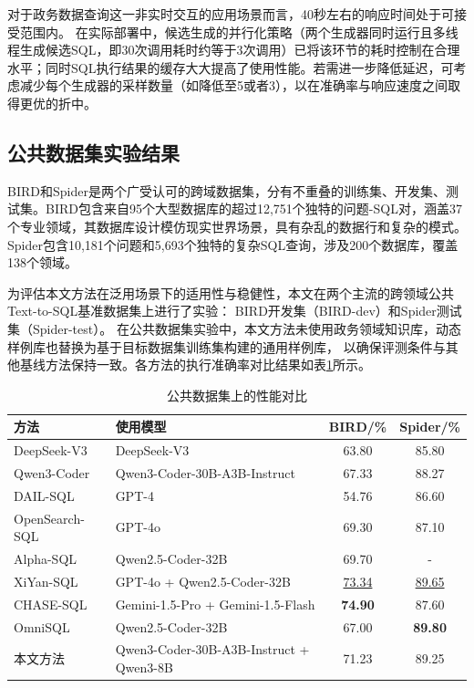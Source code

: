 对于政务数据查询这一非实时交互的应用场景而言，40秒左右的响应时间处于可接受范围内。
在实际部署中，候选生成的并行化策略（两个生成器同时运行且多线程生成候选SQL，即30次调用耗时约等于3次调用）已将该环节的耗时控制在合理水平；同时SQL执行结果的缓存大大提高了使用性能。若需进一步降低延迟，可考虑减少每个生成器的采样数量（如降低至5或者3），以在准确率与响应速度之间取得更优的折中。

\subsection{公共数据集实验结果}
BIRD和Spider是两个广受认可的跨域数据集，分有不重叠的训练集、开发集、测试集。BIRD包含来自95个大型数据库的超过12,751个独特的问题-SQL对，涵盖37个专业领域，其数据库设计模仿现实世界场景，具有杂乱的数据行和复杂的模式。Spider包含10,181个问题和5,693个独特的复杂SQL查询，涉及200个数据库，覆盖138个领域。

为评估本文方法在泛用场景下的适用性与稳健性，本文在两个主流的跨领域公共Text-to-SQL基准数据集上进行了实验：
BIRD\cite{liu2025bird}开发集（BIRD-dev）和Spider\cite{zeng2018spider}测试集（Spider-test）。
在公共数据集实验中，本文方法未使用政务领域知识库，动态样例库也替换为基于目标数据集训练集构建的通用样例库，
以确保评测条件与其他基线方法保持一致。各方法的执行准确率对比结果如表\ref{tab:public_results}所示。

\begin{table}[htbp]
	\setlength{\abovecaptionskip}{5pt}
	\setlength{\belowcaptionskip}{5pt}
	\caption{公共数据集上的性能对比}
	\label{tab:public_results}
	\centering
	\begin{tabular}{llcc}
		\toprule
		方法 & 使用模型 & BIRD/\% & Spider/\% \\
		\midrule
		DeepSeek-V3 & DeepSeek-V3 & 63.80 & 85.80 \\
		Qwen3-Coder & Qwen3-Coder-30B-A3B-Instruct & 67.33 & 88.27 \\
		\midrule
		DAIL-SQL & GPT-4 & 54.76 & 86.60 \\
		OpenSearch-SQL & GPT-4o & 69.30 & 87.10 \\
		Alpha-SQL & Qwen2.5-Coder-32B & 69.70 & - \\
		\midrule
		XiYan-SQL & GPT-4o + Qwen2.5-Coder-32B & \underline{73.34} & \underline{89.65} \\
		CHASE-SQL & Gemini-1.5-Pro + Gemini-1.5-Flash & \textbf{74.90} & 87.60 \\
		OmniSQL & Qwen2.5-Coder-32B & 67.00 & \textbf{89.80} \\
		\midrule
		本文方法 & Qwen3-Coder-30B-A3B-Instruct + Qwen3-8B & 71.23 & 89.25 \\
		\bottomrule
	\end{tabular}
\end{table}

